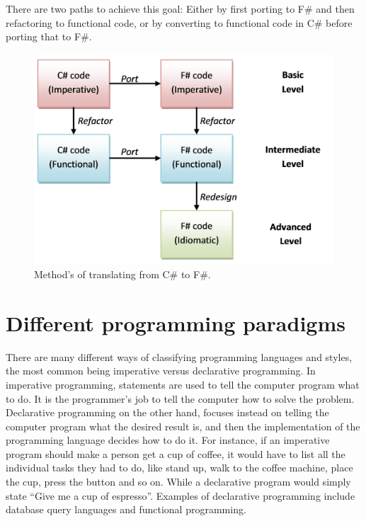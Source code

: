 \documentclass[12pt, a4paper]{article}
\begin{document}
There are two paths to achieve this goal: Either by first porting to F\# and then refactoring to functional code, or by converting to functional code in C\# before porting that to F\#.

\begin{figure}[!h]
    \includegraphics[scale=0.6]{image01}
    \centering
    \caption{Method's of translating from C\# to F\#.}
\end{figure}

\newpage

\section{Different programming paradigms}
There are many different ways of classifying programming languages and styles, the most common being imperative versus declarative programming. In imperative programming, statements are used to tell the computer program what to do. It is the programmer’s job to tell the computer how to solve the problem. Declarative programming on the other hand, focuses instead on telling the computer program what the desired result is, and then the implementation of the programming language decides how to do it. For instance, if an imperative program should make a person get a cup of coffee, it would have to list all the individual tasks they had to do, like stand up, walk to the coffee machine, place the cup, press the button and so on. While a declarative program would simply state “Give me a cup of espresso”. Examples of declarative programming include database query languages and functional programming.\\
\end{document}
